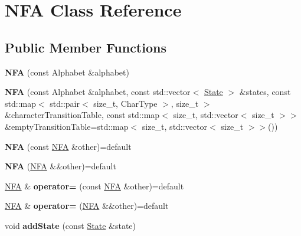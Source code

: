 \hypertarget{classNFA}{}\section{N\+FA Class Reference}
\label{classNFA}
\subsection*{Public Member Functions}
\begin{DoxyCompactItemize}
\item 
{\bfseries N\+FA} (const Alphabet \&alphabet)\hypertarget{classNFA_ae8841f4b0dbe122187e2a64c73643769}{}\label{classNFA_ae8841f4b0dbe122187e2a64c73643769}

\item 
{\bfseries N\+FA} (const Alphabet \&alphabet, const std\+::vector$<$ \hyperlink{structState}{State} $>$ \&states, const std\+::map$<$ std\+::pair$<$ size\+\_\+t, Char\+Type $>$, size\+\_\+t $>$ \&character\+Transition\+Table, const std\+::map$<$ size\+\_\+t, std\+::vector$<$ size\+\_\+t $>$$>$ \&empty\+Transition\+Table=std\+::map$<$ size\+\_\+t, std\+::vector$<$ size\+\_\+t $>$$>$())\hypertarget{classNFA_ae7fe25f259e31506f1358608f44b3d24}{}\label{classNFA_ae7fe25f259e31506f1358608f44b3d24}

\item 
{\bfseries N\+FA} (const \hyperlink{classNFA}{N\+FA} \&other)=default\hypertarget{classNFA_ae7303013f54a9f08704ae9b805c38650}{}\label{classNFA_ae7303013f54a9f08704ae9b805c38650}

\item 
{\bfseries N\+FA} (\hyperlink{classNFA}{N\+FA} \&\&other)=default\hypertarget{classNFA_a4d1844d6d9d20506be1d80dd6e81d011}{}\label{classNFA_a4d1844d6d9d20506be1d80dd6e81d011}

\item 
\hyperlink{classNFA}{N\+FA} \& {\bfseries operator=} (const \hyperlink{classNFA}{N\+FA} \&other)=default\hypertarget{classNFA_afad27066b284b7bf217df99a415d292d}{}\label{classNFA_afad27066b284b7bf217df99a415d292d}

\item 
\hyperlink{classNFA}{N\+FA} \& {\bfseries operator=} (\hyperlink{classNFA}{N\+FA} \&\&other)=default\hypertarget{classNFA_aa8a9cfe181878d1ee0279feeab1d46c5}{}\label{classNFA_aa8a9cfe181878d1ee0279feeab1d46c5}

\item 
void {\bfseries add\+State} (const \hyperlink{structState}{State} \&state)\hypertarget{classNFA_a12aa5a3267473c67ad7c75f9d13f2157}{}\label{classNFA_a12aa5a3267473c67ad7c75f9d13f2157}


\end{DoxyCompactItemize}
